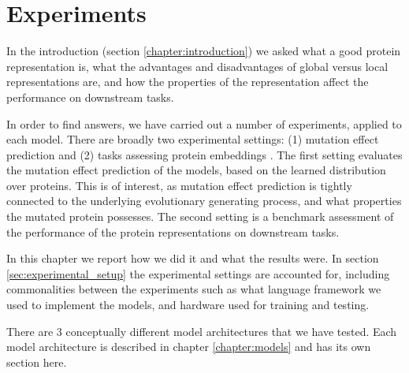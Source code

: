 \chapter{Experiments}
\label{chapter:experiments}

In the introduction (section \ref{chapter:introduction}) we asked what a good protein representation is, what the advantages and disadvantages of global versus local representations are, and how the properties of the representation affect the performance on downstream tasks.

In order to find answers, we have carried out a number of experiments, applied to each model. There are broadly two experimental settings: (1) mutation effect prediction and (2) tasks assessing protein embeddings \cite{rao2019evaluating}. The first setting evaluates the mutation effect prediction of the models, based on the learned distribution over proteins. This is of interest, as mutation effect prediction is tightly connected to the underlying evolutionary generating process, and what properties the mutated protein possesses. The second setting is a benchmark assessment of the performance of the protein representations on downstream tasks.

In this chapter we report how we did it and what the results were. In section \ref{sec:experimental_setup} the experimental settings are accounted for, including commonalities between the experiments such as what language framework we used to implement the models, and hardware used for training and testing. 

There are 3 conceptually different model architectures that we have tested. Each model architecture is described in chapter \ref{chapter:models} and has its own section here. 




